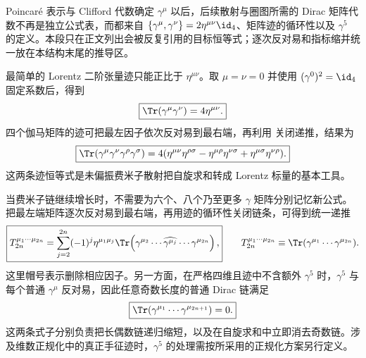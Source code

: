
Poincar\'e 表示与 Clifford 代数确定 $\gamma^\mu$ 以后，后续散射与圈图所需的 Dirac 矩阵代数不再是独立公式表，而都来自
$\{\gamma^\mu,\gamma^\nu\}=2\eta^{\mu\nu}\id_4$、矩阵迹的循环性以及 $\gamma^5$ 的定义。本段只在正文列出会被反复引用的目标恒等式；逐次反对易和指标缩并统一放在本结构末尾的推导区。

最简单的 Lorentz 二阶张量迹只能正比于 $\eta^{\mu\nu}$。取 $\mu=\nu=0$ 并使用 $(\gamma^0)^2=\id_4$ 固定系数后，得到
\begin{equation}
 \boxed{\Tr(\gamma^\mu\gamma^\nu)=4\eta^{\mu\nu}.}
 \label{eq:trace-two-gamma-r9}
\end{equation}
四个伽马矩阵的迹可把最左因子依次反对易到最右端，再利用 关闭递推，结果为
\begin{equation}
 \boxed{
 \Tr(\gamma^\mu\gamma^\nu\gamma^\rho\gamma^\sigma)
 =4(\eta^{\mu\nu}\eta^{\rho\sigma}
 -\eta^{\mu\rho}\eta^{\nu\sigma}
 +\eta^{\mu\sigma}\eta^{\nu\rho}).}
 \label{eq:trace-four-gamma-r9}
\end{equation}
这两条迹恒等式是未偏振费米子散射把自旋求和转成 Lorentz 标量的基本工具。


当费米子链继续增长时，不需要为六个、八个乃至更多 $\gamma$ 矩阵分别记忆新公式。把最左端矩阵逐次反对易到最右端，再用迹的循环性关闭链条，可得到统一递推
\begin{equation}
 \boxed{
 T_{2n}^{\mu_1\cdots\mu_{2n}}
 =\sum_{j=2}^{2n}(-1)^j\eta^{\mu_1\mu_j}
 \Tr\!\left(\gamma^{\mu_2}\cdots\widehat{\gamma^{\mu_j}}\cdots\gamma^{\mu_{2n}}\right),}
 \qquad
 T_{2n}^{\mu_1\cdots\mu_{2n}}
 \equiv\Tr(\gamma^{\mu_1}\cdots\gamma^{\mu_{2n}}).
 \label{eq:trace-even-recursion-r68}
\end{equation}
这里帽号表示删除相应因子。另一方面，在严格四维且迹中不含额外 $\gamma^5$ 时，$\gamma^5$ 与每个普通 $\gamma^\mu$ 反对易，因此任意奇数长度的普通 Dirac 链满足
\begin{equation}
 \boxed{\Tr(\gamma^{\mu_1}\cdots\gamma^{\mu_{2n+1}})=0.}
 \label{eq:trace-odd-zero-r68}
\end{equation}
这两条式子分别负责把长偶数链递归缩短，以及在自旋求和中立即消去奇数链。涉及维数正规化中的真正手征迹时，$\gamma^5$ 的处理需按所采用的正规化方案另行定义。

